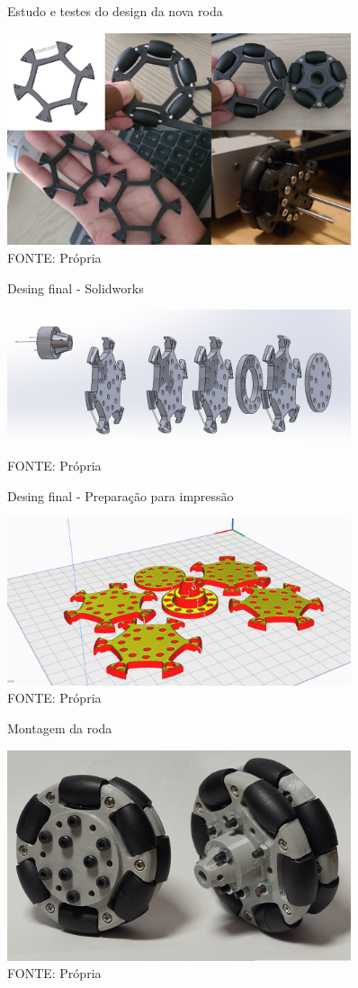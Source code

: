 \begin{figure}[h]
	\centering
	\caption{Estudo e testes do design da nova roda}
	\includegraphics[width=0.9\textwidth]{figures/estudo_roda}
    \caption*{FONTE: Própria}
\end{figure}

\begin{figure}[h]
	\centering
	\caption{Desing final - Solidworks}
	\includegraphics[width=0.9\textwidth]{figures/roda_processo_desing_passo2}
    \caption*{FONTE: Própria}
\end{figure}

\begin{figure}[h]
	\centering
	\caption{Desing final - Preparação para impressão}
	\includegraphics[width=0.9\textwidth]{figures/roda_processo_desing_passo3}
    \caption*{FONTE: Própria}
\end{figure}

\begin{figure}[h]
	\centering
	\caption{Montagem da roda}
	\includegraphics[width=0.9\textwidth]{figures/roda_processo_desing_passo4}
    \caption*{FONTE: Própria}
\end{figure}